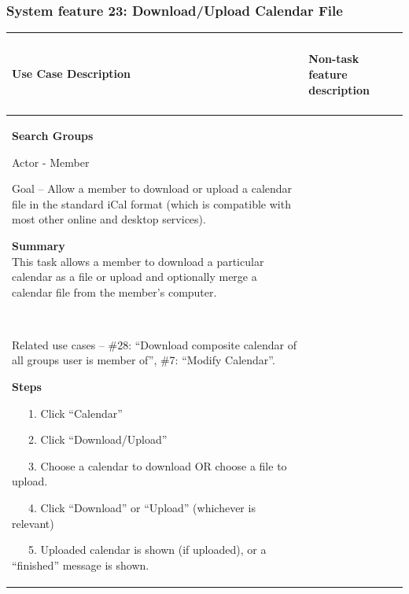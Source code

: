 \documentclass[letterpaper]{article}
\newcommand\textstyleDefaultParagraphFont[1]{#1}
\begin{document}
\subsubsection[System feature 23: Download/Upload Calendar
File]{\rmfamily System feature 23: Download/Upload Calendar File}
\begin{flushleft}
\tablehead{}
\begin{supertabular}{|m{3.17056in}|m{3.1712599in}|}
\hline
\bfseries\color{black} Use Case Description &
\paragraph[Non{}-task feature
description]{\rmfamily Non-task feature
description}
\\\hline
{\bfseries\color{black} Search Groups}

{\color{black} Actor - Member}

{\color{black} Goal -- Allow a member to download or upload a calendar
file in the standard iCal format (which is compatible with most other
online and desktop services).}

{\color{black}
\textstyleDefaultParagraphFont{\textbf{Summary}}\textstyleDefaultParagraphFont{\textbf{\ \ }}\newline
\textstyleDefaultParagraphFont{This task allows a member to download a
particular calendar as a file or upload and optionally merge a calendar
file from the member{\textquoteright}s computer.}}

~

{\color{black} Related use cases -- \#28: {\textquotedblleft}Download
composite calendar of all groups user is member of{\textquotedblright},
\#7: {\textquotedblleft}Modify Calendar{\textquotedblright}.}

{\color{black} \textstyleDefaultParagraphFont{\textbf{Steps}}}

{\color{black} \ \ \ 1. Click
{\textquotedblleft}Calendar{\textquotedblright} }

{\color{black} \ \ \ 2. Click
{\textquotedblleft}Download/Upload{\textquotedblright} }

{\color{black} \ \ \ 3. Choose a calendar to download OR choose a file
to upload.}

{\color{black} \ \ \ 4. Click
{\textquotedblleft}Download{\textquotedblright} or
{\textquotedblleft}Upload{\textquotedblright} (whichever is relevant)}

{\color{black} \ \ \ 5. Uploaded calendar is shown (if uploaded), or a
{\textquotedblleft}finished{\textquotedblright} message is shown.}


\end{supertabular}
\end{flushleft}
\end{document}
